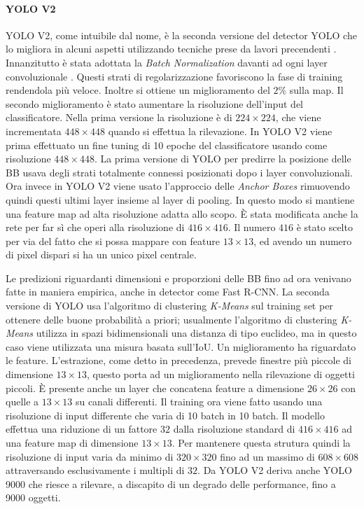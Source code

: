 \paragraph{YOLO V2}
\ac{YOLO} V2, come intuibile dal nome, è la seconda versione del detector \ac{YOLO} che lo migliora in alcuni aspetti utilizzando tecniche prese da lavori precendenti \cite{redmon2017yolo9000}.
Innanzitutto è stata adottata la \textit{Batch Normalization} davanti ad ogni layer convoluzionale \cite{ioffe2015batch}. Questi strati di regolarizzazione favoriscono la fase 
di training rendendola più veloce. Inoltre si ottiene un miglioramento del $2\%$ sulla \ac{map}.
Il secondo miglioramento è stato aumentare la risoluzione dell'input del classificatore. Nella prima versione la risoluzione è di $224 \times 224$, che viene incrementata $448 \times 448$ quando si effettua la rilevazione.
In \ac{YOLO} V2 viene prima effettuato un fine tuning di 10 epoche del classificatore usando come risoluzione $448 \times 448$.
La prima versione di \ac{YOLO} per predirre la posizione delle \ac{BB} usava degli strati totalmente connessi posizionati dopo i layer convoluzionali. Ora invece in \ac{YOLO} V2 viene usato l'approccio delle \textit{Anchor Boxes} rimuovendo quindi questi ultimi layer insieme al layer di pooling. 
In questo modo si mantiene una feature map ad alta risoluzione adatta allo scopo. È stata modificata anche la rete per far sì che operi alla risoluzione di $416 \times 416$. Il numero $416$ è stato scelto per via del fatto che si possa mappare con feature $13 \times 13$, ed avendo un numero di pixel dispari si ha un unico pixel centrale. 

Le predizioni riguardanti dimensioni e proporzioni delle \ac{BB} fino ad ora venivano fatte in maniera empirica, anche in detector come Fast R-CNN. La seconda versione di \ac{YOLO} usa l'algoritmo di clustering \textit{K-Means} sul training set per ottenere delle buone probabilità a priori; usualmente l'algoritmo di clustering \textit{K-Means} utilizza in spazi bidimensionali una distanza di tipo euclideo, ma in questo caso viene utilizzata una misura basata sull'\ac{IoU}. 
Un miglioramento ha riguardato le feature. L'estrazione, come detto in precedenza, prevede finestre più piccole di dimensione $13 \times 13$, questo porta ad un miglioramento nella rilevazione di oggetti piccoli. È presente anche un layer che concatena feature a dimensione $26 \times 26$ con quelle a $13 \times 13$ su canali differenti. 
Il training ora viene fatto usando una risoluzione di input differente che varia di 10 batch in 10 batch. Il modello effettua una riduzione di un fattore $32$ dalla risoluzione standard di $416 \times 416$ ad una feature map di dimensione $13 \times 13$. Per mantenere questa strutura quindi la risoluzione di input varia da minimo di $320 \times 320$ fino ad un massimo di $608 \times 608$ attraversando esclusivamente i multipli di $32$. Da \ac{YOLO} V2 deriva anche \ac{YOLO} 9000 che riesce a rilevare, a discapito di un degrado delle performance, fino a 9000 oggetti.

